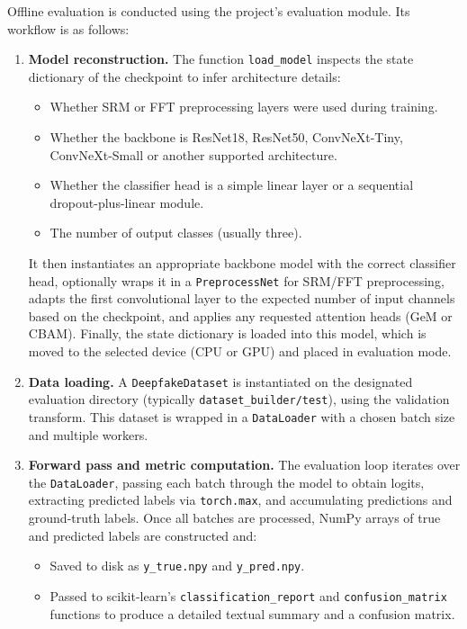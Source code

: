 Offline evaluation is conducted using the project's evaluation module. Its workflow is as follows:
\begin{enumerate}
  \item \textbf{Model reconstruction.} The function \texttt{load\_model} inspects the state dictionary of the checkpoint to infer architecture details:
  \begin{itemize}
    \item Whether SRM or FFT preprocessing layers were used during training.
    \item Whether the backbone is ResNet18, ResNet50, ConvNeXt-Tiny, ConvNeXt-Small or another supported architecture.
    \item Whether the classifier head is a simple linear layer or a sequential dropout-plus-linear module.
    \item The number of output classes (usually three).
  \end{itemize}
  It then instantiates an appropriate backbone model with the correct classifier head, optionally wraps it in a \texttt{PreprocessNet} for SRM/FFT preprocessing, adapts the first convolutional layer to the expected number of input channels based on the checkpoint, and applies any requested attention heads (GeM or CBAM). Finally, the state dictionary is loaded into this model, which is moved to the selected device (CPU or GPU) and placed in evaluation mode.
  \item \textbf{Data loading.} A \texttt{DeepfakeDataset} is instantiated on the designated evaluation directory (typically \texttt{dataset\_builder/test}), using the validation transform. This dataset is wrapped in a \texttt{DataLoader} with a chosen batch size and multiple workers.
  \item \textbf{Forward pass and metric computation.} The evaluation loop iterates over the \texttt{DataLoader}, passing each batch through the model to obtain logits, extracting predicted labels via \texttt{torch.max}, and accumulating predictions and ground-truth labels. Once all batches are processed, NumPy arrays of true and predicted labels are constructed and:
  \begin{itemize}
    \item Saved to disk as \texttt{y\_true.npy} and \texttt{y\_pred.npy}.
    \item Passed to scikit-learn's \texttt{classification\_report} and \texttt{confusion\_matrix} functions to produce a detailed textual summary and a confusion matrix.
  \end{itemize}
\end{enumerate}

